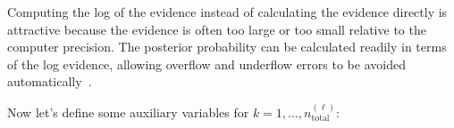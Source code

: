 Computing the log of the evidence instead of calculating the evidence directly
is attractive because the evidence is often too large or too small relative to
the computer precision.
%
The posterior probability can be calculated readily in terms of the log
evidence, allowing overflow and underflow errors to be avoided
automatically~\cite{ChOlPr10}.  



Now let's define some auxiliary variables for
$k=1,\ldots,n_\text{total}^{(\ell)}$:
    

